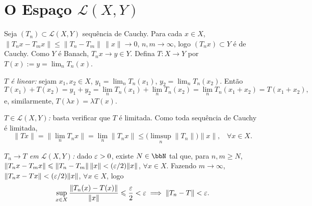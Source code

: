 \section{O Espaço $\mathcal{L}(X,Y)$}






\begin{myproof}
	Seja $(T_n)\subset\mathcal{L}(X,Y)$ sequência de Cauchy. Para cada $x\in X$,
	$\|T_nx-T_mx\|\leq\|T_n-T_m\|\,\|x\|\to 0$, $n,m\to\infty$, logo $(T_nx)\subset Y$ é de Cauchy. Como
	$Y$ é Banach, $T_nx\to y\in Y$. Defina $T:X\to Y$ por $T(x):=y=\lim_n T_n(x)$.

	\textit{$T$ é linear:} sejam $x_1,x_2\in X$, $y_1=\lim_n T_n(x_1)$, $y_2=\lim_n T_n(x_2)$. Então
	$$T(x_1)+T(x_2)=y_1+y_2=\lim_n T_n(x_1)+\lim_n T_n(x_2)=\lim_n T_n(x_1+x_2)=T(x_1+x_2)\text{,}$$
	e, similarmente, $T(\lambda x)=\lambda T(x)$.

	\textit{$T\in\mathcal{L}(X,Y)$:} basta verificar que $T$ é limitada. Como toda sequência de Cauchy é
	limitada,
	$$\|Tx\|=\|\lim_n T_nx\|=\lim_n\|T_nx\|\leq \Big(\limsup_n \|T_n\|\Big)\|x\|\text{,}\quad\forall x\in X\text{.}$$

	\textit{$T_n\to T$ em $\mathcal{L}(X,Y)$:} dado $\varepsilon>0$, existe $N\in\bbN$ tal que, para
	$n,m\geq N$, $\|T_nx-T_mx\|\leqslant\|T_n-T_m\|\,\|x\|<(\varepsilon/2)\|x\|$, $\forall x\in X$. Fazendo
	$m\to\infty$, $\|T_nx-Tx\|<(\varepsilon/2)\|x\|$, $\forall x\in X$, logo
	$$\sup_{x\in X}\frac{\|T_n(x)-T(x)\|}{\|x\|}\leqslant\frac{\varepsilon}{2}<\varepsilon \implies \|T_n-T\|<\varepsilon\text{.}$$
\end{myproof}

